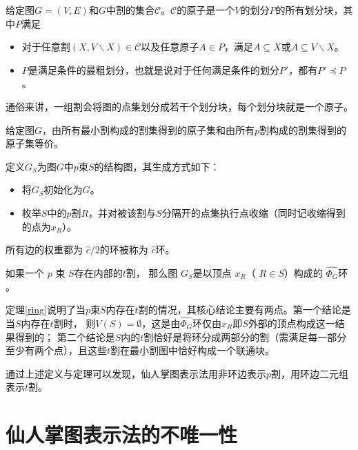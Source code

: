 \begin{definition}[原子]
  给定图$G=(V,E)$和$G$中割的集合$\mathcal{C}$。$\mathcal{C}$的原子是一个$V$的划分$P$的所有划分块，其中$P$满足
  \begin{itemize}
    \item 对于任意割$(X,V\backslash X)\in \mathcal{C}$以及任意原子$A\in P$，满足$A\subseteq X$或$A\subseteq V\backslash X$。
    \item $P$是满足条件的最粗划分，也就是说对于任何满足条件的划分$P'$，都有$P'\preceq P$。
  \end{itemize}
\end{definition}

通俗来讲，一组割会将图的点集划分成若干个划分块，每个划分块就是一个原子。

\begin{theorem}\cite{dinitz1976structure}
  给定图$G$，由所有最小割构成的割集得到的原子集和由所有$p$割构成的割集得到的原子集等价。
\end{theorem}

\begin{definition}[$p$束结构图$G_S$]
定义$G_S$为图$G$中$p$束$S$的结构图，其生成方式如下：
\begin{itemize}
  \item 将$G_S$初始化为$G$。
  \item 枚举$S$中的$p$割$R$，并对被该割与$S$分隔开的点集执行点收缩（同时记收缩得到的点为$x_R$）。
\end{itemize}
\begin{definition}[$\hat c$环]
  所有边的权重都为 $\hat{c}/2$的环被称为 $\hat{c}$环。 
\end{definition}
\end{definition}
\begin{theorem}[含$t$割的$p$束的结构图为环]\cite{dinitz1976structure}
  \label{ring}
  如果一个 $p$ 束 $S$存在内部的$t$割，
  那么图 $G_S$是以顶点 $x_R$（ $R\in S$）构成的 $\hat{\Phi_G}$环 。
\end{theorem}
定理\ref{ring}说明了当$p$束$S$内存在$t$割的情况，其核心结论主要有两点。第一个结论是当$S$内存在$t$割时，
则$V(S)=\emptyset$，这是由$\hat{\Phi_G}$环仅由$x_R$即$S$外部的顶点构成这一结果得到的；
第二个结论是$S$内的$t$割恰好是将环分成两部分的割（需满足每一部分至少有两个点），且这些$t$割在最小割图中恰好构成一个联通块。

通过上述定义与定理可以发现，仙人掌图表示法用非环边表示$p$割，用环边二元组表示$t$割。



\section{仙人掌图表示法的不唯一性}

